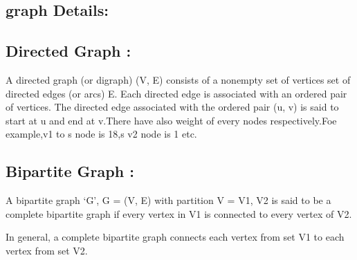 \documentclass[12pt,letterpaper]{report}
\begin{document}
\begin{enumerate}
\newpage
\section{graph Details:}
\subsection{{\color{blue}Directed Graph :}}A directed graph (or digraph) (V, E) consists of a nonempty set of vertices set of
directed edges (or arcs) E. Each directed edge is associated with an ordered pair of vertices.
The directed edge associated with the ordered pair (u, v) is said to start at u and end at v.There have also weight of every nodes respectively.Foe example,v1 to s node is 18,s v2 node is 1 etc.
\end{enumerate}
\begin{center}
 
    \end{center}
\subsection{{\color{blue}Bipartite Graph :}} A bipartite graph ‘G’, G = (V, E) with partition V = {V1, V2} is said to be a complete bipartite graph if every vertex in V1 is connected to every vertex of V2.

In general, a complete bipartite graph connects each vertex from set V1 to each vertex from set V2.\\
\end{document}
